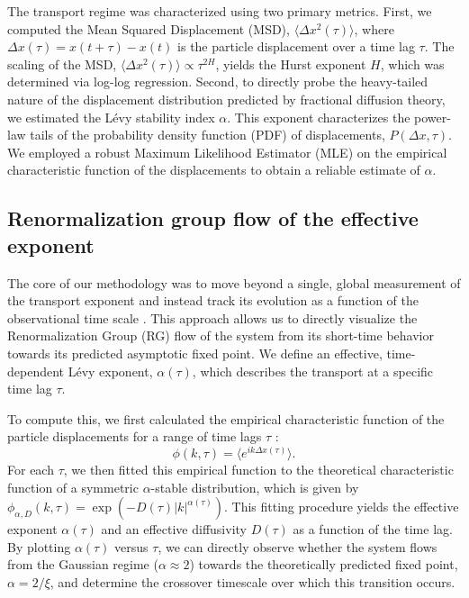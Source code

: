 \documentclass[]{article}
\begin{document}
The transport regime was characterized using two primary metrics. First, we computed the Mean Squared Displacement (MSD), $\langle \Delta x^2(\tau) \rangle$, where $\Delta x(\tau) = x(t+\tau) - x(t)$ is the particle displacement over a time lag $\tau$. The scaling of the MSD, $\langle \Delta x^2(\tau) \rangle \propto \tau^{2H}$, yields the Hurst exponent $H$, which was determined via log-log regression. Second, to directly probe the heavy-tailed nature of the displacement distribution predicted by fractional diffusion theory, we estimated the Lévy stability index $\alpha$. This exponent characterizes the power-law tails of the probability density function (PDF) of displacements, $P(\Delta x, \tau)$. We employed a robust Maximum Likelihood Estimator (MLE) on the empirical characteristic function of the displacements to obtain a reliable estimate of $\alpha$.

\subsection{Renormalization group flow of the effective exponent}
The core of our methodology was to move beyond a single, global measurement of the transport exponent and instead track its evolution as a function of the observational time scale \citep{bouchara2015anomaloustransportobservableaverage}. This approach allows us to directly visualize the Renormalization Group (RG) flow of the system from its short-time behavior towards its predicted asymptotic fixed point. We define an effective, time-dependent Lévy exponent, $\alpha(\tau)$, which describes the transport at a specific time lag $\tau$.

To compute this, we first calculated the empirical characteristic function of the particle displacements for a range of time lags $\tau$ \citep{kaiser2026limittheoremsempiricaldistribution}:
\begin{equation}\phi(k, \tau) = \langle e^{ik\Delta x(\tau)} \rangle.\end{equation}
For each $\tau$, we then fitted this empirical function to the theoretical characteristic function of a symmetric $\alpha$-stable distribution, which is given by $\phi_{\alpha, D}(k, \tau) = \exp(-D(\tau)|k|^{\alpha(\tau)})$. This fitting procedure yields the effective exponent $\alpha(\tau)$ and an effective diffusivity $D(\tau)$ as a function of the time lag. By plotting $\alpha(\tau)$ versus $\tau$, we can directly observe whether the system flows from the Gaussian regime ($\alpha \approx 2$) towards the theoretically predicted fixed point, $\alpha = 2/\xi$, and determine the crossover timescale over which this transition occurs.
\end{document}
